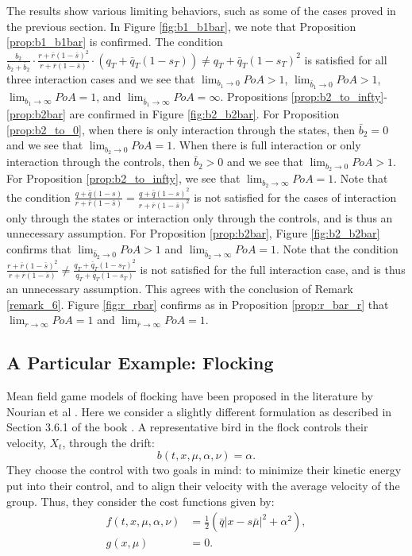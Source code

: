 \documentclass[11pt]{article}
\begin{document}
The results show various limiting behaviors, such as some of the cases proved in the previous section. In Figure \ref{fig:b1_b1bar}, we note that Proposition \ref{prop:b1_b1bar} is confirmed. The condition $\frac{b_2}{b_2+\bar{b}_2}\cdot \frac{r + \bar{r}(1- \bar{s})^2}{r + \bar{r}(1-\bar{s})}\cdot (q_T+\bar{q}_T(1-s_T)) \neq q_T+\bar{q}_T(1-s_T)^2$ is satisfied for all three interaction cases and we see that $\lim_{b_1 \to 0}PoA >1$, $\lim_{\bar{b}_1 \to 0}PoA>1$, $\lim_{b_1 \to \infty}PoA = 1$, and $\lim_{\bar{b}_1 \to \infty}PoA = \infty$. Propositions \ref{prop:b2_to_infty}-\ref{prop:b2bar} are confirmed in Figure \ref{fig:b2_b2bar}. For Proposition \ref{prop:b2_to_0}, when there is only interaction through the states, then $\bar{b}_2=0$ and we see that $\lim_{b_2 \to 0}PoA= 1$. When there is full interaction or only interaction through the controls, then $\bar{b}_2>0$ and we see that $\lim_{b_2 \to 0}PoA>1$. For Proposition \ref{prop:b2_to_infty}, we see that $\lim_{b_2 \to \infty}PoA= 1$. Note that the condition $\frac{q + \bar{q}(1-s)}{r + \bar{r}(1-\bar{s})}= \frac{q + \bar{q}(1-s)^2}{r + \bar{r}(1-\bar{s})^2}$ is  not satisfied for the cases of interaction only through the states or interaction only through the controls, and is thus an unnecessary assumption. For Proposition \ref{prop:b2bar}, Figure \ref{fig:b2_b2bar} confirms that $\lim_{\bar{b}_2 \to 0}PoA>1$ and $\lim_{\bar{b}_2 \to \infty}PoA= 1$. Note that the condition $\frac{r + \bar{r}(1- \bar{s})^2}{r + \bar{r}(1-\bar{s})} \neq \frac{q_T+\bar{q}_T(1-s_T)^2}{q_T+\bar{q}_T(1-s_T)}$ is not satisfied for the full interaction case, and is thus an unnecessary assumption. This agrees with the conclusion of Remark \ref{remark_6}. Figure \ref{fig:r_rbar} confirms as in Proposition \ref{prop:r_bar_r} that $\lim_{r \to \infty}PoA= 1$ and $\lim_{\bar{r} \to \infty}PoA= 1$.

\subsection{\textbf{A Particular Example: Flocking}}
Mean field game models of flocking have been proposed in the literature by Nourian et al \cite{nourian2010synthesis}\cite{nourian2011mean}. Here we consider a slightly different formulation as described in Section 3.6.1 of the book \cite{Carmona_book}. A representative bird in the flock controls their velocity, $X_t$, through the drift:
\begin{equation*}
    b(t,x,\mu,\alpha,\nu)=\alpha.
\end{equation*}
They choose the control with two goals in mind: to minimize their kinetic energy put into their control, and to align their velocity with the average velocity of the group. Thus, they consider the cost functions given by:
\begin{equation*}
\begin{split}
    f(t,x,\mu,\alpha,\nu)&=\frac{1}{2}\left(\bar{q}|x-s\bar{\mu}|^2 +\alpha^2 \right), \\
    g(x,\mu)&=0.
\end{split}
\end{equation*}
\end{document}
